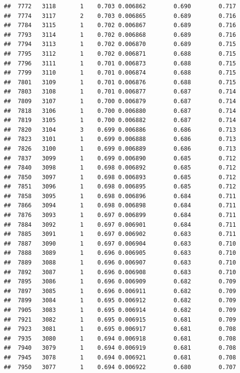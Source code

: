 \documentclass[
]{book}
\begin{document}
\begin{verbatim}
##  7772   3118       1    0.703 0.006862        0.690        0.717
##  7774   3117       2    0.703 0.006865        0.689        0.716
##  7784   3115       1    0.702 0.006867        0.689        0.716
##  7793   3114       1    0.702 0.006868        0.689        0.716
##  7794   3113       1    0.702 0.006870        0.689        0.715
##  7795   3112       1    0.702 0.006871        0.688        0.715
##  7796   3111       1    0.701 0.006873        0.688        0.715
##  7799   3110       1    0.701 0.006874        0.688        0.715
##  7801   3109       1    0.701 0.006876        0.688        0.715
##  7803   3108       1    0.701 0.006877        0.687        0.714
##  7809   3107       1    0.700 0.006879        0.687        0.714
##  7818   3106       1    0.700 0.006880        0.687        0.714
##  7819   3105       1    0.700 0.006882        0.687        0.714
##  7820   3104       3    0.699 0.006886        0.686        0.713
##  7823   3101       1    0.699 0.006888        0.686        0.713
##  7826   3100       1    0.699 0.006889        0.686        0.713
##  7837   3099       1    0.699 0.006890        0.685        0.712
##  7840   3098       1    0.698 0.006892        0.685        0.712
##  7850   3097       1    0.698 0.006893        0.685        0.712
##  7851   3096       1    0.698 0.006895        0.685        0.712
##  7858   3095       1    0.698 0.006896        0.684        0.711
##  7866   3094       1    0.698 0.006898        0.684        0.711
##  7876   3093       1    0.697 0.006899        0.684        0.711
##  7884   3092       1    0.697 0.006901        0.684        0.711
##  7885   3091       1    0.697 0.006902        0.683        0.711
##  7887   3090       1    0.697 0.006904        0.683        0.710
##  7888   3089       1    0.696 0.006905        0.683        0.710
##  7889   3088       1    0.696 0.006907        0.683        0.710
##  7892   3087       1    0.696 0.006908        0.683        0.710
##  7895   3086       1    0.696 0.006909        0.682        0.709
##  7897   3085       1    0.696 0.006911        0.682        0.709
##  7899   3084       1    0.695 0.006912        0.682        0.709
##  7905   3083       1    0.695 0.006914        0.682        0.709
##  7921   3082       1    0.695 0.006915        0.681        0.709
##  7923   3081       1    0.695 0.006917        0.681        0.708
##  7935   3080       1    0.694 0.006918        0.681        0.708
##  7940   3079       1    0.694 0.006919        0.681        0.708
##  7945   3078       1    0.694 0.006921        0.681        0.708
##  7950   3077       1    0.694 0.006922        0.680        0.707

\end{verbatim}
\end{document}
